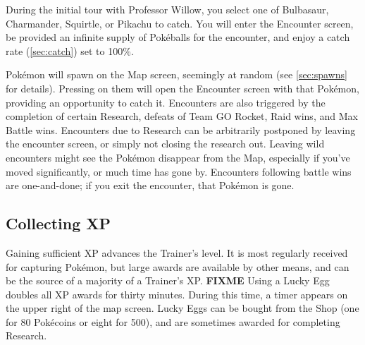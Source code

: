 During the initial tour with Professor Willow, you select one of
 Bulbasaur, Charmander, Squirtle, or Pikachu to catch.
You will enter the Encounter screen, be provided an infinite supply of
  Pokéballs for the encounter, and enjoy a catch rate (\autoref{sec:catch}) set to 100\%.

Pokémon will spawn on the Map screen, seemingly at random (see \autoref{sec:spawns} for details).
Pressing on them will open the Encounter screen with that Pokémon,
  providing an opportunity to catch it.
Encounters are also triggered by the completion of certain Research,
  defeats of Team GO Rocket, Raid wins, and Max Battle wins.
Encounters due to Research can be arbitrarily postponed by leaving the encounter screen,
  or simply not closing the research out.
Leaving wild encounters might see the Pokémon disappear from the Map, especially
  if you've moved significantly, or much time has gone by.
Encounters following battle wins are one-and-done; if you exit the encounter,
  that Pokémon is gone.

\subsection{Collecting XP}
\label{subsec:getxp}
Gaining sufficient XP advances the Trainer's level.
It is most regularly received for capturing Pokémon, but large awards are
  available by other means, and can be the source of a majority of a Trainer's XP.
  \textbf{FIXME}
Using a Lucky Egg doubles all XP awards for thirty minutes.
During this time, a timer appears on the upper right of the map screen.
Lucky Eggs can be bought from the Shop (one for 80 Pokécoins or eight for 500),
  and are sometimes awarded for completing Research.

